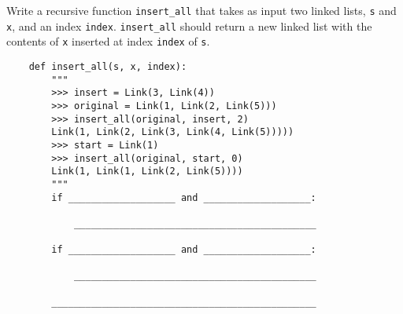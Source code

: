 \begin{blocksection}
    \question Write a recursive function \lstinline{insert_all} that takes as input two linked lists, \lstinline{s} and \lstinline{x}, and an index \lstinline{index}. \lstinline{insert_all} should return a new linked list with the contents of \lstinline{x} inserted at index \lstinline{index} of \lstinline{s}. 

    \begin{lstlisting}
    def insert_all(s, x, index):
        """
        >>> insert = Link(3, Link(4))
        >>> original = Link(1, Link(2, Link(5)))
        >>> insert_all(original, insert, 2)
        Link(1, Link(2, Link(3, Link(4, Link(5)))))
        >>> start = Link(1)
        >>> insert_all(original, start, 0)
        Link(1, Link(1, Link(2, Link(5))))
        """
        if ___________________ and ___________________:

            ___________________________________________

        if ___________________ and ___________________:

            ___________________________________________

        _______________________________________________
    
    \end{lstlisting}
\end{blocksection}
